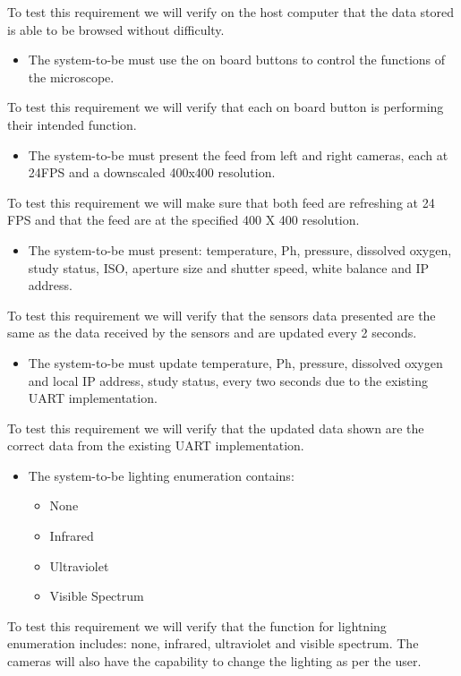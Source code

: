 To test this requirement we will verify on the host computer that the data stored is able to be browsed without difficulty.
\begin{itemize}
    \item The system-to-be must use the on board buttons to control the functions of the microscope.
\end{itemize}
To test this requirement we will verify that each on board button is performing their intended function.
\begin{itemize}
   \item The system-to-be must present the feed from left and right cameras, each at 24FPS and a downscaled 400x400 resolution.
\end{itemize}
To test this requirement we will make sure that both feed are refreshing at 24 FPS and that the feed are at the specified 400 X 400 resolution.
\begin{itemize}
    \item The system-to-be must present: temperature, Ph, pressure, dissolved oxygen, study status, ISO, aperture size and shutter speed, white balance and IP address.
\end{itemize}
To test this requirement we will verify that the sensors data presented are the same as the data received by the sensors and are updated every 2 seconds.
\begin{itemize}
    \item The system-to-be must update temperature, Ph, pressure, dissolved oxygen and local IP address, study status, every two seconds due to the existing UART implementation.
\end{itemize}
To test this requirement we will verify that the updated data shown are the correct data from the existing UART implementation.
\begin{itemize}
    \item The system-to-be lighting enumeration contains:
    \begin{itemize}
        \item None
        \item Infrared
        \item Ultraviolet
        \item Visible Spectrum
    \end{itemize}
\end{itemize}
To test this requirement we will verify that the function for lightning enumeration includes: none, infrared, ultraviolet and visible spectrum. The cameras will also have the capability to change the lighting as per the user.
